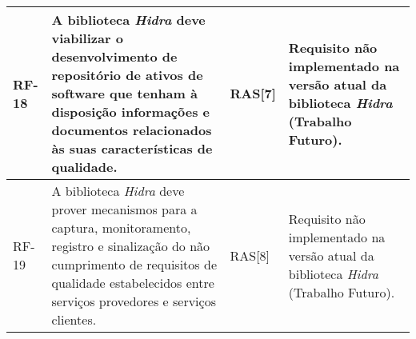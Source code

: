 \begin{longtable}{ | l | p{6cm} | p{2cm} | p{4cm} |}
	RF-18
	& A biblioteca \textit{Hidra} deve viabilizar o desenvolvimento  de repositório de ativos de software que tenham à disposição  informações e documentos relacionados às suas características  de qualidade.
	& RAS[7]
	& Requisito não implementado na versão atual da biblioteca \textit{Hidra} (Trabalho Futuro). \\ \hline

	RF-19
	& A biblioteca \textit{Hidra} deve prover mecanismos para a  captura, monitoramento, registro e sinalização do não  cumprimento de requisitos de qualidade estabelecidos entre  serviços provedores e serviços clientes.
	& RAS[8]
	& Requisito não implementado na versão atual da biblioteca \textit{Hidra} (Trabalho Futuro). \\ \hline


\end{longtable}


